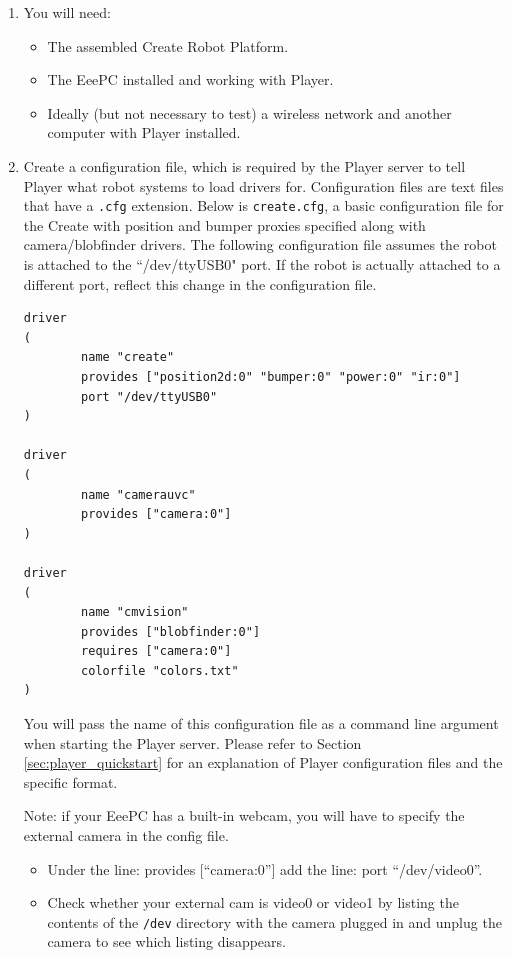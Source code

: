 \begin{enumerate}

\item You will need:
\begin{itemize}
\item The assembled Create Robot Platform.
\item The EeePC installed and working with Player.
\item Ideally (but not necessary to test) a wireless network and another computer with Player installed.
\end{itemize}

\item Create a configuration file, which is required by the Player server to tell Player what robot systems to load drivers for. Configuration files are text files that have a \texttt{.cfg} extension. Below is \texttt{create.cfg}, a basic configuration file for the Create with position and bumper proxies specified along with camera/blobfinder drivers. The following configuration file assumes the robot is attached to the ``/dev/ttyUSB0" port. If the robot is actually attached to a different port, reflect this change in the configuration file.

\begin{verbatim}
driver
(
        name "create"
        provides ["position2d:0" "bumper:0" "power:0" "ir:0"]
        port "/dev/ttyUSB0"
)

driver
(
        name "camerauvc"
        provides ["camera:0"]
)

driver
(
        name "cmvision"
        provides ["blobfinder:0"]
        requires ["camera:0"]
        colorfile "colors.txt"
)
\end{verbatim}

You will pass the name of this configuration file as a command line argument when starting the Player server. Please refer to Section \ref{sec:player_quickstart} for an explanation of Player configuration files and the specific format.

Note: if your EeePC has a built-in webcam, you will have to specify the external camera in the config file.
\begin{itemize}
\item Under the line:   provides [``camera:0'']   add the line:   port ``/dev/video0''.
\item Check whether your external cam is video0 or video1 by listing the contents of the \texttt{/dev} directory with the camera plugged in and unplug the camera to see which listing disappears.
\end{itemize}


\end{enumerate}
